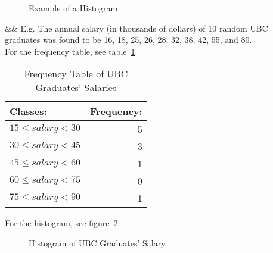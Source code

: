 \begin{easylist}
\begin{figure}[!htb]
				\caption{Example of a Histogram}
				\label{fig:histogram}
			\end{figure}
			
			\medskip
			&& E.g. The annual salary (in thousands of dollars) of 10 random UBC graduates was found to be 16, 18, 25, 26, 28, 32, 38, 42, 55, and 80. \smallskip \\
			For the frequency table, see table~\ref{tab:ubc-graduates-salaries-freq-table}.

			\Deactivate
			\begin{table}[!htb]
				\centering
				\caption{Frequency Table of UBC Graduates' Salaries}
				\label{tab:ubc-graduates-salaries-freq-table}
				\begin{tabular}{ l r }
					Classes: & Frequency: \\
					\hline
					$15 \leq salary < 30$ & 5 \\
					$30 \leq salary < 45$ & 3 \\
					$45 \leq salary < 60$ & 1 \\
					$60 \leq salary < 75$ & 0 \\
					$75 \leq salary < 90$ & 1
				\end{tabular}
			\end{table}
			\Activate
			
			For the histogram, see figure~\ref{fig:ubc-graduates-salaries-histogram}.
			
			\begin{figure}[!htb]
				\centering
				
				\caption{Histogram of UBC Graduates' Salary}
				\label{fig:ubc-graduates-salaries-histogram}
			\end{figure}

\end{easylist}
